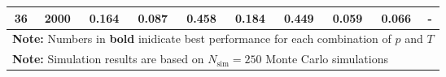 \begin{landscape}
\begin{table}[p]
\begin{tabular}{cccccccccc}
	 36  & 2000 &       0.164        & 0.087                     &            0.458            &           0.184           &            0.449            & \textbf{0.059}         &          0.066           & -                 \\
	\hline
	\hline
    \multicolumn{10}{l}{\textbf{Note:} Numbers in \textbf{bold} inidicate best performance for each combination of $p$ and $T$} \\
    \multicolumn{10}{l}{\textbf{Note:} Simulation results are based on $N_\text{sim} = 250$ Monte Carlo simulations}
    \end{tabular}
    \end{table}
    \egroup
\end{landscape}
    
